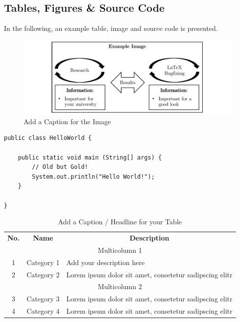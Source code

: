 \documentclass[
	12pt,
	a4paper,
	american,
	oneside
	]{scrartcl}
\begin{document}
	
	\subsection{Tables, Figures \& Source Code}
	
	In the following, an example table, image and source code is presented.
	\bigskip
	
	\begin{figure}[!htb]
		\centering
		\includegraphics[width=1\textwidth]{images/example-image}
		\caption{Add a Caption for the Image}
		\label{fig:figure1}
	\end{figure}

	\begin{minipage}{\linewidth}
		\linespread{1}
		\begin{lstlisting}[caption={Hello World in Java},captionpos=b,label=source:helloWorld]
public class HelloWorld {
	
	public static void main (String[] args)	{
		// Old but Gold!
		System.out.println("Hello World!");
	}

}
		\end{lstlisting}
	\end{minipage}

	\small
	\begin{longtable}{|c|c|p{}|}
		\hline
		\caption{Add a Caption / Headline for your Table}\label{tab:table2}\\
		\hline
		\multicolumn{1}{|c|}{\cellcolor{gray!40}\textbf{No.}} & \multicolumn{1}{c|}{\cellcolor{gray!40}\textbf{Name}} & \multicolumn{1}{c|}{\cellcolor{gray!40}\textbf{Description}} \\ \hline
		\multicolumn{3}{|c|}{\cellcolor{gray!40}Multicolumn 1}\\  \hline
		1  & Category 1 & Add your description here \\ \hline
		2 & Category 2 & Lorem ipsum dolor sit amet, consetetur sadipscing elitr \\  \hline
		\multicolumn{3}{|c|}{\cellcolor{gray!40}Multicolumn 2} \\  \hline
		3 & Category 3 & Lorem ipsum dolor sit amet, consetetur sadipscing elitr \\  \hline
		4 & Category 4 & Lorem ipsum dolor sit amet, consetetur sadipscing elitr \\  \hline
	\end{longtable}
\end{document}
